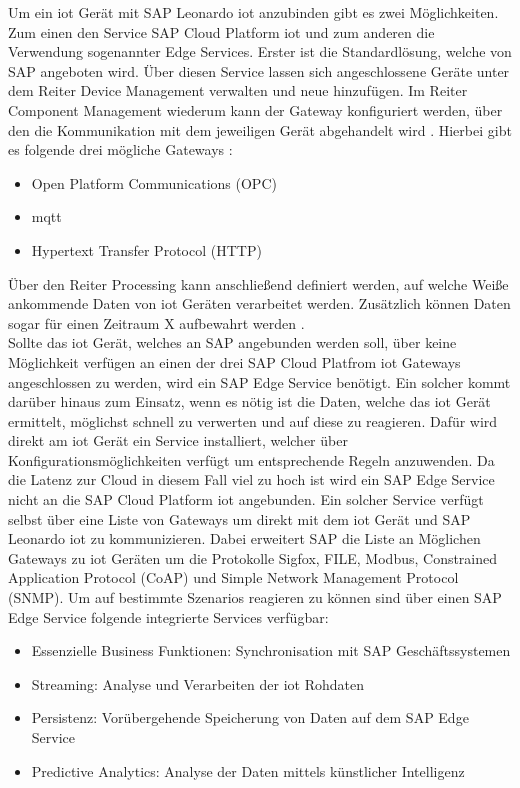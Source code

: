 \noindent Um ein \ac{iot} Gerät mit SAP Leonardo \ac{iot} anzubinden gibt es zwei Möglichkeiten. Zum einen den Service SAP Cloud Platform \ac{iot} und zum anderen die Verwendung sogenannter Edge Services. Erster ist die Standardlösung, welche von SAP angeboten wird. Über diesen Service lassen sich angeschlossene Geräte unter dem Reiter Device Management verwalten und neue hinzufügen. Im Reiter Component Management wiederum kann der Gateway konfiguriert werden, über den die Kommunikation mit dem jeweiligen Gerät abgehandelt wird \cite[Seite 200f]{Holtschulte20:IOS}. Hierbei gibt es folgende drei mögliche Gateways \cite[Seite 117]{Holtschulte20:IOS}:
\begin{itemize}
	\setlength{\itemsep}{1pt}
	\item{Open Platform Communications (OPC)}
	\item{\ac{mqtt}}
	\item{Hypertext Transfer Protocol (HTTP)}
\end{itemize}
Über den Reiter Processing kann anschließend definiert werden, auf welche Weiße ankommende Daten von \ac{iot} Geräten verarbeitet werden. Zusätzlich können Daten sogar für einen Zeitraum X aufbewahrt werden \cite[Seite 205]{Holtschulte20:IOS}.\\
\noindent Sollte das \ac{iot} Gerät, welches an SAP angebunden werden soll, über keine Möglichkeit verfügen an einen der drei SAP Cloud Platfrom \ac{iot} Gateways angeschlossen zu werden, wird ein SAP Edge Service benötigt. Ein solcher kommt darüber hinaus zum Einsatz, wenn es nötig ist die Daten, welche das \ac{iot} Gerät ermittelt, möglichst schnell zu verwerten und auf diese zu reagieren. Dafür wird direkt am \ac{iot} Gerät ein Service installiert, welcher über Konfigurationsmöglichkeiten verfügt um entsprechende Regeln anzuwenden. Da die Latenz zur Cloud in diesem Fall viel zu hoch ist wird ein SAP Edge Service nicht an die SAP Cloud Platform \ac{iot} angebunden. Ein solcher Service verfügt selbst über eine Liste von Gateways um direkt mit dem \ac{iot} Gerät und SAP Leonardo \ac{iot} zu kommunizieren. Dabei erweitert SAP die Liste an Möglichen Gateways zu \ac{iot} Geräten um die Protokolle Sigfox, FILE, Modbus, Constrained Application Protocol (CoAP) und Simple Network Management Protocol (SNMP). Um auf bestimmte Szenarios reagieren zu können sind über einen SAP Edge Service folgende integrierte Services verfügbar\cite[Seite 229ff]{Holtschulte20:IOS}:
\begin{itemize}
	\setlength{\itemsep}{1pt}
	\item{Essenzielle Business Funktionen: Synchronisation mit SAP Geschäftssystemen}
	\item{Streaming: Analyse und Verarbeiten der \ac{iot} Rohdaten}
	\item{Persistenz: Vorübergehende Speicherung von Daten auf dem SAP Edge Service}
	\item{Predictive Analytics: Analyse der Daten mittels künstlicher Intelligenz}
\end{itemize}   


